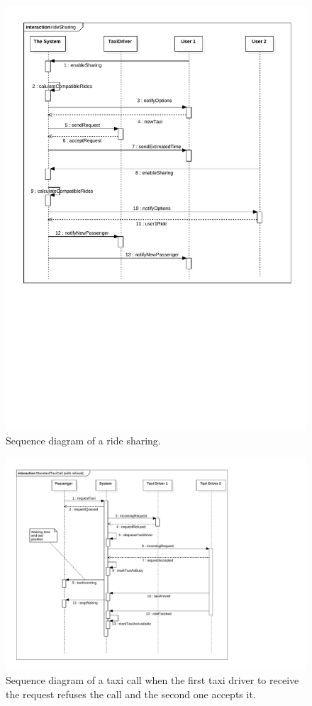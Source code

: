 \begin{figure}
	\includegraphics[width=\textwidth]{diagrams/ride_sharing.pdf}
	\caption{Sequence diagram of a ride sharing.}
	\label{fig:sequence-sharing}
\end{figure}

\begin{figure}
	\includegraphics[width=\textwidth]{diagrams/sequence_taxicall_refused.pdf}
	\caption{Sequence diagram of a taxi call when the first taxi driver to receive the request refuses the call and the second one accepts it.}
	\label{fig:sequence-taxicall-refused}
\end{figure}

